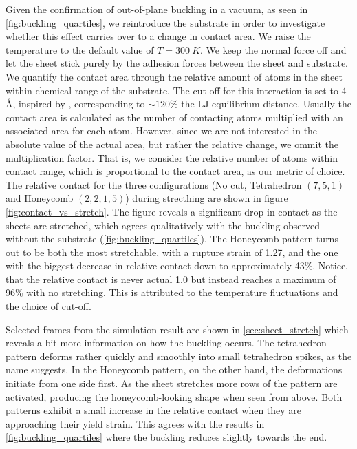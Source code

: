 Given the confirmation of out-of-plane buckling in a vacuum, as seen in
\cref{fig:buckling_quartiles}, we reintroduce the substrate in order to
investigate whether this effect carries over to a change in contact area. We
raise the temperature to the default value of $T =\SI{300}{K}$. We keep the
normal force off and let the sheet stick purely by the adhesion forces between
the sheet and substrate. We quantify the contact area through the relative
amount of atoms in the sheet within chemical range of the substrate. The cut-off
for this interaction is set to 4 Å, inspired by \cite{li_evolving_2016},
corresponding to $\sim 120$\% the LJ equilibrium distance. Usually the contact
area is calculated as the number of contacting atoms multiplied with an
associated area for each atom. However, since we are not interested in the
absolute value of the actual area, but rather the relative change, we ommit the
multiplication factor. That is, we consider the relative number of atoms within
contact range, which is proportional to the contact area, as our metric of
choice. The relative contact for the three configurations (No cut, Tetrahedron
$(7,5,1)$ and Honeycomb $(2,2,1,5)$) during strecthing are shown in figure
\cref{fig:contact_vs_stretch}. The figure reveals a significant drop in contact
as the sheets are stretched, which agrees qualitatively with the buckling
observed without the substrate (\cref{fig:buckling_quartiles}). The Honeycomb
pattern turns out to be both the most stretchable, with a rupture strain of 1.27, and the one with the biggest decrease in relative
contact down to approximately 43\%. Notice, that the relative contact is never
actual 1.0 but instead reaches a maximum of 96\% with no stretching. This is
attributed to the temperature fluctuations and the choice of cut-off.

Selected frames from the simulation result are shown in \cref{sec:sheet_stretch}
which reveals a bit more information on how the buckling occurs. The tetrahedron pattern deforms rather quickly and smoothly into small tetrahedron
spikes, as the name suggests. In the Honeycomb pattern, on the other hand, the
deformations initiate from one side first. As the sheet stretches more rows of
the pattern are activated, producing the honeycomb-looking shape when seen from
above. Both patterns exhibit a small increase in the relative contact when they
are approaching their yield strain. This agrees with the results in
\cref{fig:buckling_quartiles} where the buckling reduces slightly towards the
end.


